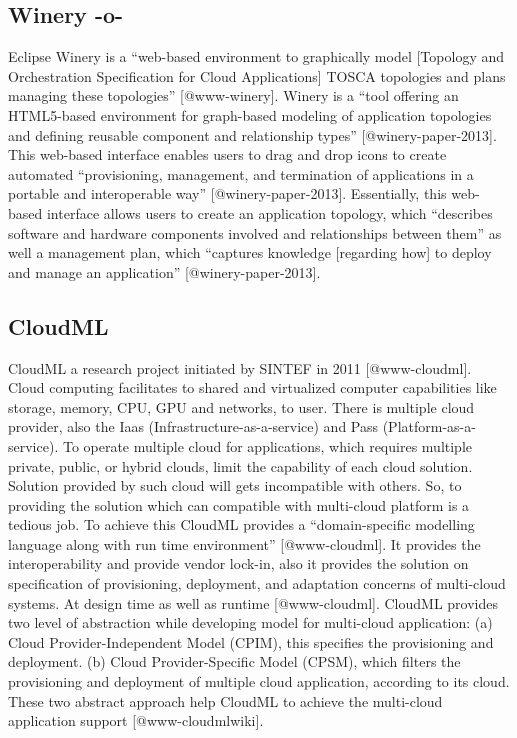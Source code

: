 \subsection{Winery -o-}

Eclipse Winery is a ``web-based environment to graphically model
[Topology and Orchestration Specification for Cloud Applications]
TOSCA topologies and plans managing these
topologies'' [@www-winery]. Winery is a ``tool offering an
HTML5-based environment for graph-based modeling of application
topologies and defining reusable component and relationship
types'' [@winery-paper-2013]. This web-based interface enables
users to drag and drop icons to create automated ``provisioning,
management, and termination of applications in a portable and
interoperable way'' [@winery-paper-2013].  Essentially, this
web-based interface allows users to create an application topology,
which ``describes software and hardware components involved and
relationships between them'' as well a management plan, which
``captures knowledge [regarding how] to deploy and manage an
application'' [@winery-paper-2013].


     

\subsection{CloudML}
                                                            
CloudML a research project initiated by SINTEF in 2011
 [@www-cloudml]. Cloud computing facilitates to shared and
virtualized computer capabilities like storage, memory, CPU, GPU and
networks, to user. There is multiple cloud provider, also the Iaas
(Infrastructure-as-a-service) and Pass (Platform-as-a-service). To
operate multiple cloud for applications, which requires multiple
private, public, or hybrid clouds, limit the capability of each cloud
solution.  Solution provided by such cloud will gets incompatible with
others. So, to providing the solution which can compatible with
multi-cloud platform is a tedious job. To achieve this CloudML
provides a ``domain-specific modelling language along with run time
environment'' [@www-cloudml]. It provides the interoperability and
provide vendor lock-in, also it provides the solution on specification
of provisioning, deployment, and adaptation concerns of multi-cloud
systems. At design time as well as runtime [@www-cloudml].
CloudML provides two level of abstraction while developing model for
multi-cloud application: (a) Cloud Provider-Independent Model (CPIM),
this specifies the provisioning and deployment.  (b) Cloud
Provider-Specific Model (CPSM), which filters the provisioning and
deployment of multiple cloud application, according to its cloud.
These two abstract approach help CloudML to achieve the multi-cloud
application support [@www-cloudmlwiki].

